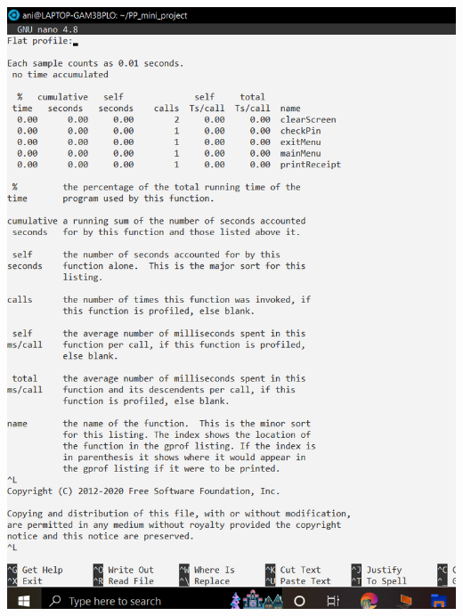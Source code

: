 \documentclass{article}
\begin{document}
\includegraphics[scale=0.35]{profilling2.png} \\ \\
\end{document}
